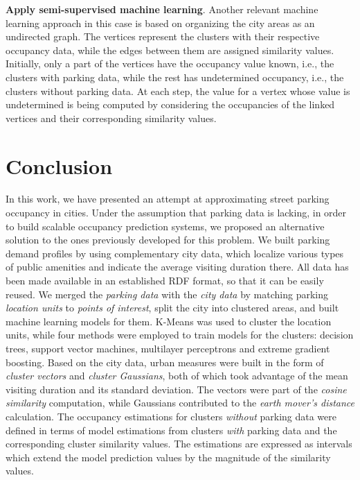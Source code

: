 \begin{romanlist}
	\item \textbf{Apply semi-supervised machine learning}.
	Another relevant machine learning approach in this case is based on organizing the city areas as an undirected graph.
	The vertices represent the clusters with their respective occupancy data, while the edges between them are assigned similarity values.
	Initially, only a part of the vertices have the occupancy value known, i.e., the clusters with parking data, while the rest has undetermined occupancy, i.e., the clusters without parking data.
	At each step, the value for a vertex whose value is undetermined is being computed by considering the occupancies of the linked vertices and their corresponding similarity values.
\end{romanlist} 


\section{Conclusion}
In this work, we have presented an attempt at approximating street parking occupancy in cities.
Under the assumption that parking data is lacking, in order to build scalable occupancy prediction systems, we proposed an alternative solution to the ones previously developed for this problem.
We built parking demand profiles by using complementary city data, which localize various types of public amenities and indicate the average visiting duration there.
All data has been made available in an established RDF format, so that it can be easily reused.
We merged the \textit{parking data} with the \textit{city data} by matching parking \textit{location units} to \textit{points of interest}, split the city into clustered areas, and built machine learning models for them.
K-Means was used to cluster the location units, while four methods were employed to train models for the clusters: decision trees, support vector machines, multilayer perceptrons and extreme gradient boosting.
Based on the city data, urban measures were built in the form of \textit{cluster vectors} and \textit{cluster Gaussians}, both of which took advantage of the mean visiting duration and its standard deviation.
The vectors were part of the \textit{cosine similarity} computation, while Gaussians contributed to the \textit{earth mover's distance} calculation.
The occupancy estimations for clusters \textit{without} parking data were defined in terms of model estimations from clusters \textit{with} parking data and the corresponding cluster similarity values.
The estimations are expressed as intervals which extend the model prediction values by the magnitude of the similarity values. 

